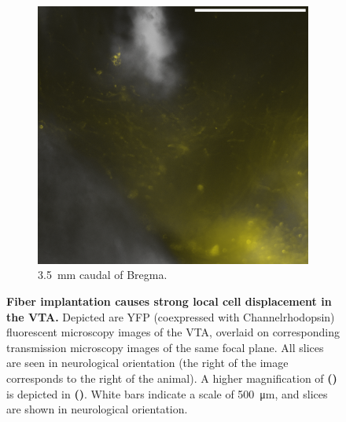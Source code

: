 \begin{figure}[h!]
\begin{subfigure}{.43\textwidth}
		\label{fig:h6589}
	\end{subfigure}
	\begin{subfigure}{.2728\textwidth}
		\centering
		\includegraphics[width=\textwidth]{img/sub-6589_slice-a4_zoom-10_scene-2_transmission-yfp-comb_straight.png}
                \caption{\SI{3.5}{\milli\meter} caudal of Bregma.}
		\label{fig:h6589z}
	\end{subfigure}
        \vspace{-.5em}
	\caption{
		\textbf{Fiber implantation causes strong local cell displacement in the VTA.}
                Depicted are YFP (coexpressed with Channelrhodopsin) fluorescent microscopy images of the VTA, overlaid on corresponding transmission microscopy images of the same focal plane.
                All slices are seen in neurological orientation (the right of the image corresponds to the right of the animal).
                A higher magnification of \textbf{()} is depicted in \textbf{()}.
                White bars indicate a scale of \SI{500}{\micro\meter}, and slices are shown in neurological orientation.
                }
	\label{fig:h}
\end{figure}


